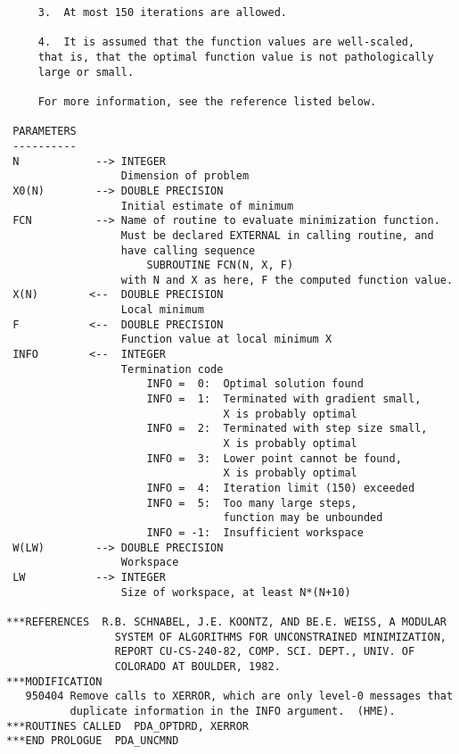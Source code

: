 \begin{verbatim}
     3.  At most 150 iterations are allowed.

     4.  It is assumed that the function values are well-scaled,
     that is, that the optimal function value is not pathologically
     large or small.

     For more information, see the reference listed below.

 PARAMETERS
 ----------
 N            --> INTEGER
                  Dimension of problem
 X0(N)        --> DOUBLE PRECISION
                  Initial estimate of minimum
 FCN          --> Name of routine to evaluate minimization function.
                  Must be declared EXTERNAL in calling routine, and
                  have calling sequence
                      SUBROUTINE FCN(N, X, F)
                  with N and X as here, F the computed function value.
 X(N)        <--  DOUBLE PRECISION
                  Local minimum
 F           <--  DOUBLE PRECISION
                  Function value at local minimum X
 INFO        <--  INTEGER
                  Termination code
                      INFO =  0:  Optimal solution found
                      INFO =  1:  Terminated with gradient small,
                                  X is probably optimal
                      INFO =  2:  Terminated with step size small,
                                  X is probably optimal
                      INFO =  3:  Lower point cannot be found,
                                  X is probably optimal
                      INFO =  4:  Iteration limit (150) exceeded
                      INFO =  5:  Too many large steps,
                                  function may be unbounded
                      INFO = -1:  Insufficient workspace
 W(LW)        --> DOUBLE PRECISION
                  Workspace
 LW           --> INTEGER
                  Size of workspace, at least N*(N+10)

***REFERENCES  R.B. SCHNABEL, J.E. KOONTZ, AND BE.E. WEISS, A MODULAR
                 SYSTEM OF ALGORITHMS FOR UNCONSTRAINED MINIMIZATION,
                 REPORT CU-CS-240-82, COMP. SCI. DEPT., UNIV. OF
                 COLORADO AT BOULDER, 1982.
***MODIFICATION
   950404 Remove calls to XERROR, which are only level-0 messages that
          duplicate information in the INFO argument.  (HME).
***ROUTINES CALLED  PDA_OPTDRD, XERROR
***END PROLOGUE  PDA_UNCMND
\end{verbatim}

